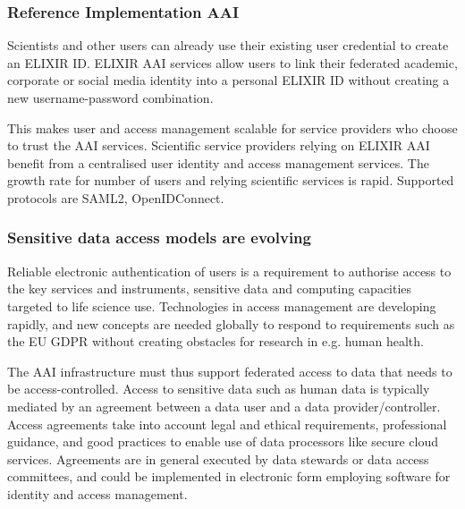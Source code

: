 \documentclass[fleqn,10pt]{wlscirep}
\begin{document}
{\subsubsection{Reference Implementation AAI}
Scientists and other users can already use their existing user credential to create an ELIXIR ID\cite{elixir-aai}. ELIXIR AAI services allow users to link their federated academic, corporate or social media identity into a personal ELIXIR ID without creating a new username-password combination.  

This makes user and access management scalable for service providers who choose to trust the AAI services. Scientific service providers relying on ELIXIR AAI benefit from a centralised user identity and access management services. The growth rate for number of users and relying scientific services is rapid. Supported protocols are SAML2, OpenIDConnect.

\subsubsection{Sensitive data access models are evolving}
Reliable electronic authentication of users is a requirement to authorise access to the key services and instruments, sensitive data and computing capacities targeted to life science use. Technologies in access management are developing rapidly, and new concepts are needed globally to respond to requirements such as the EU GDPR without creating obstacles for research in e.g. human health.

The AAI infrastructure must thus support federated access to data that needs to be access-controlled. Access to sensitive data such as human data is typically mediated by an agreement between a data user and a data provider/controller. Access agreements take into account legal and ethical requirements, professional guidance, and good practices to enable use of data processors like secure cloud services. Agreements are in general executed by data stewards or data access committees, and could be implemented in electronic form employing software for identity and access management.\cite{Brandizi2017}\cite{Linden}
 
}
\end{document}
